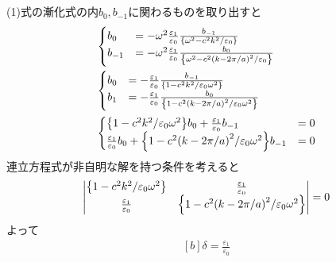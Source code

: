 \documentclass[../../master.tex]{subfiles}
\begin{document}
\section{}
(1)式の漸化式の内\(b_0,b_{-1}\)に関わるものを取り出すと
\begin{equation}\begin{aligned}[b]
    &\begin{cases}
        b_0 &= -\omega^2\frac{\varepsilon_1}{\varepsilon_0}\frac{b_{-1}}{\qty{\omega^2-c^2k^2/\varepsilon_0}}\\
        b_{-1} &= -\omega^2\frac{\varepsilon_1}{\varepsilon_0}\frac{b_{0}}{\qty{\omega^2-c^2\qty(k-2\pi/a)^2/\varepsilon_0}}
    \end{cases}\\
    &\begin{cases}
        b_0 &= -\frac{\varepsilon_1}{\varepsilon_0}\frac{b_{-1}}{\qty{1-c^2k^2/\varepsilon_0\omega^2}}\\
        b_1 &= -\frac{\varepsilon_1}{\varepsilon_0}\frac{b_{0}}{\qty{1-c^2\qty(k-2\pi/a)^2/\varepsilon_0\omega^2}}
    \end{cases}\\
    &\begin{cases}
        \qty{1-c^2k^2/\varepsilon_0\omega^2}b_0 + \frac{\varepsilon_1}{\varepsilon_0}b_{-1}&=0\\
        \frac{\varepsilon_1}{\varepsilon_0}b_{0}+ \qty{1-c^2\qty(k-2\pi/a)^2/\varepsilon_0\omega^2}b_{-1} &= 0
    \end{cases}\\
\end{aligned}\end{equation}
連立方程式が非自明な解を持つ条件を考えると
\begin{equation}\begin{aligned}[b]
    \begin{vmatrix}
        \qty{1-c^2k^2/\varepsilon_0\omega^2}& \frac{\varepsilon_1}{\varepsilon_0}\\
        \frac{\varepsilon_1}{\varepsilon_0} & \qty{1-c^2\qty(k-2\pi/a)^2/\varepsilon_0\omega^2}
    \end{vmatrix}=0
\end{aligned}\end{equation}
よって
\begin{equation}\begin{aligned}[b]
    \delta = \frac{\varepsilon_1}{\varepsilon_0}
\end{aligned}\end{equation}
\end{document}
